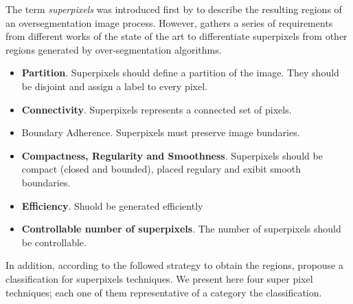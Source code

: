 The term \textit{superpixels} was introduced first by \cite{Ren.Malik:ICCV:2003} to describe the resulting regions of an oversegmentation image process. However, \cite{Stutz.Hermans.ea:CVIU:2018} gathers a series of requirements from different works of the state of the art to differentiate superpixels from other regions generated by over-segmentation algorithms. 

\begin{itemize}
 \item \textbf{Partition}. Superpixels should define a partition of the image. They should be disjoint and assign a label to every pixel.
 \item \textbf{Connectivity}. Superpixels represents a connected set of pixels.
 \item Boundary Adherence. Superpixels must preserve image bundaries.
 \item \textbf{Compactness, Regularity and Smoothness}. Superpixels should be compact (closed and bounded), placed regulary and exibit smooth boundaries.
 \item \textbf{Efficiency}. Shuold be generated efficiently
 \item \textbf{Controllable number of superpixels}. The number of superpixels should be controllable.
\end{itemize}

In addition, according to the followed strategy   to obtain the regions, \cite{Stutz.Hermans.ea:CVIU:2018} propouse a classification for superpixels techniques. We present here four super pixel techniques; each one of them representative of a category the classification. 




